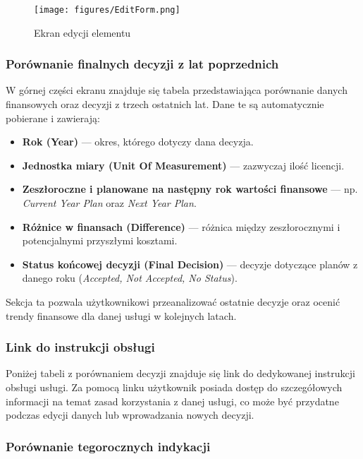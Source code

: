 \begin{figure}[h]
\centering
\texttt{[image: figures/EditForm.png]}
\caption{Ekran edycji elementu}
\label{fig:EditForm }
\end{figure}

\subsubsection{Porównanie finalnych decyzji z lat poprzednich}

W górnej części ekranu znajduje się tabela przedstawiająca porównanie danych finansowych oraz decyzji z trzech ostatnich lat. Dane te są automatycznie pobierane i zawierają:

\begin{itemize}
\item \textbf{Rok (Year)} — okres, którego dotyczy dana decyzja.
\item \textbf{Jednostka miary (Unit Of Measurement)} — zazwyczaj ilość licencji.
\item \textbf{Zeszłoroczne i planowane na następny rok wartości finansowe} — np. \textit{Current Year Plan} oraz \textit{Next Year Plan}.
\item \textbf{Różnice w finansach (Difference)} — różnica między zeszłorocznymi i potencjalnymi przyszłymi kosztami.
\item \textbf{Status końcowej decyzji (Final Decision)} — decyzje dotyczące planów z danego roku (\textit{Accepted, Not Accepted, No Status}).
\end{itemize}

Sekcja ta pozwala użytkownikowi przeanalizować ostatnie decyzje oraz ocenić trendy finansowe dla danej usługi w kolejnych latach.

\subsubsection{Link do instrukcji obsługi}

Poniżej tabeli z porównaniem decyzji znajduje się link do dedykowanej instrukcji obsługi usługi. Za pomocą linku użytkownik posiada dostęp do szczegółowych informacji na temat zasad korzystania z danej usługi, co może być przydatne podczas edycji danych lub wprowadzania nowych decyzji.

\subsubsection{Porównanie tegorocznych indykacji}

